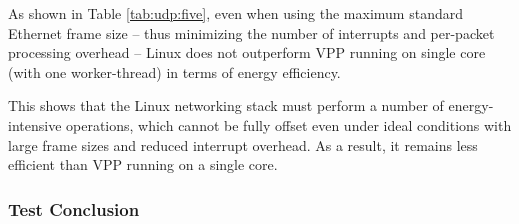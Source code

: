 As shown in Table \ref{tab:udp:five}, even when using the maximum standard Ethernet frame size -- thus minimizing the number of interrupts and per-packet processing overhead -- 
Linux does not outperform VPP running on single core (with one worker-thread) in terms of energy efficiency.

This shows that the Linux networking stack must perform a number of energy-intensive operations, 
which cannot be fully offset even under ideal conditions with large frame sizes and reduced interrupt overhead. 
As a result, it remains less efficient than VPP running on a single core.

\subsubsection{Test Conclusion}





